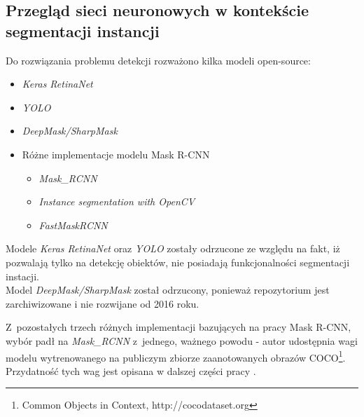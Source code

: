 \subsection{Przegląd sieci neuronowych w kontekście segmentacji instancji}

Do rozwiązania problemu detekcji rozważono kilka modeli open-source:

\begin{itemize}
	\item \textit{Keras RetinaNet} \cite{keras-retinanet}
	\item \textit{YOLO} \cite{yolo}
	\item \textit{DeepMask/SharpMask} \cite{deep-sharp-mask}
	\item Różne implementacje modelu Mask R-CNN \cite{general-mask-rcnn}
		\begin{itemize}
			\item \textit{Mask\_RCNN} \cite{matterport-mask-rcnn}
			\item \textit{Instance segmentation with OpenCV} \cite{mask-rcnn-opencv}
			\item \textit{FastMaskRCNN} \cite{fast-mask-rcnn}
		\end{itemize}
\end{itemize}

Modele \textit{Keras RetinaNet} oraz \textit{YOLO} zostały odrzucone ze względu na fakt, iż pozwalają tylko na detekcję obiektów, nie posiadają funkcjonalności segmentacji instacji. \\

Model \textit{DeepMask/SharpMask} został odrzucony, ponieważ repozytorium jest zarchiwizowane i nie rozwijane od 2016 roku.

Z~pozostałych trzech różnych implementacji bazujących na pracy Mask R-CNN, wybór padł na \textit{Mask\_RCNN} z~jednego, ważnego powodu - autor udostępnia wagi modelu wytrenowanego na publiczym zbiorze zaanotowanych obrazów COCO\footnote{Common Objects in Context, http://cocodataset.org}.
Przydatność tych wag jest opisana w dalszej części pracy .
